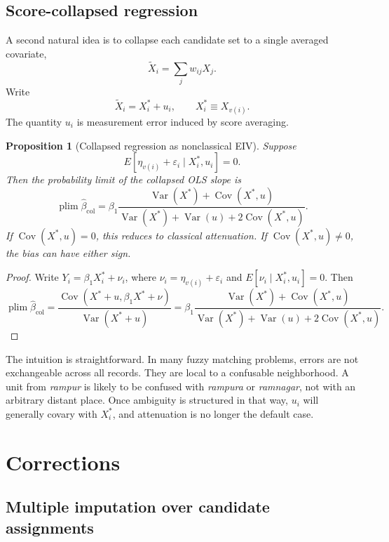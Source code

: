 \documentclass[12pt]{article}
\newtheorem{proposition}{Proposition}
\theoremstyle{remark}
\begin{document}
\subsection{Score-collapsed regression}

A second natural idea is to collapse each candidate set to a single averaged covariate,
\[
\tilde X_i=\sum_j w_{ij}X_j.
\]
Write
\[
\tilde X_i = X_i^* + u_i,\qquad X_i^*\equiv X_{v(i)}.
\]
The quantity $u_i$ is measurement error induced by score averaging.

\begin{proposition}[Collapsed regression as nonclassical EIV]
Suppose
\[
E[\eta_{v(i)}+\varepsilon_i\mid X_i^*,u_i]=0.
\]
Then the probability limit of the collapsed OLS slope is
\[
\operatorname{plim}\hat\beta_{\mathrm{col}}
=
\beta_1
\frac{\operatorname{Var}(X^*)+\operatorname{Cov}(X^*,u)}
{\operatorname{Var}(X^*)+\operatorname{Var}(u)+2\operatorname{Cov}(X^*,u)}.
\]
If $\operatorname{Cov}(X^*,u)=0$, this reduces to classical attenuation. If $\operatorname{Cov}(X^*,u)\neq 0$, the bias can have either sign.
\end{proposition}

\begin{proof}
Write $Y_i=\beta_1 X_i^*+\nu_i$, where $\nu_i=\eta_{v(i)}+\varepsilon_i$ and $E[\nu_i\mid X_i^*,u_i]=0$. Then
\[
\operatorname{plim}\hat\beta_{\mathrm{col}}
=
\frac{\operatorname{Cov}(X^*+u,\beta_1X^*+\nu)}
{\operatorname{Var}(X^*+u)}
=
\beta_1
\frac{\operatorname{Var}(X^*)+\operatorname{Cov}(X^*,u)}
{\operatorname{Var}(X^*)+\operatorname{Var}(u)+2\operatorname{Cov}(X^*,u)}.
\]
\end{proof}

The intuition is straightforward. In many fuzzy matching problems, errors are not exchangeable across all records. They are local to a confusable neighborhood. A unit from \emph{rampur} is likely to be confused with \emph{rampura} or \emph{ramnagar}, not with an arbitrary distant place. Once ambiguity is structured in that way, $u_i$ will generally covary with $X_i^*$, and attenuation is no longer the default case.

\section{Corrections}

\subsection{Multiple imputation over candidate assignments}
\end{document}
